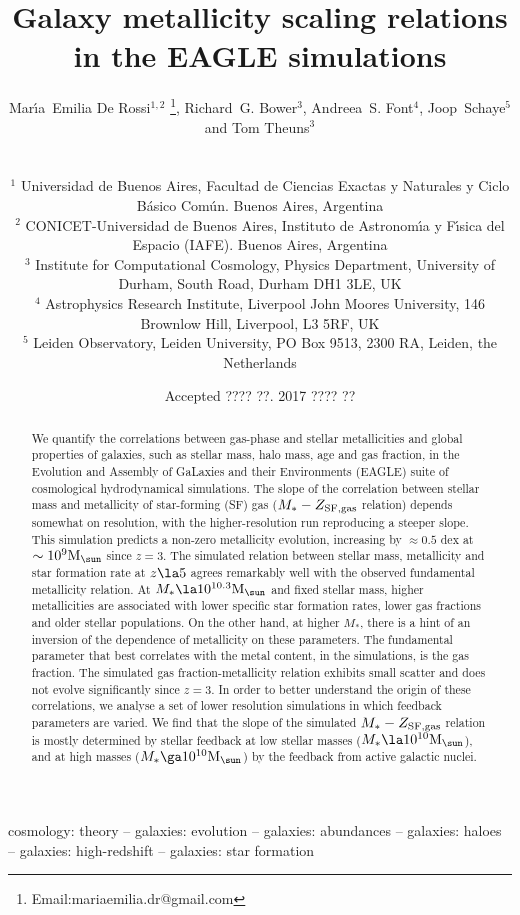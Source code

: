 \documentclass[useAMS,usenatbib]{mn2e}
\title[Metallicity scaling relations]
      {Galaxy metallicity scaling relations in the {\sc EAGLE} simulations}
\author[De Rossi et al.]
       {\parbox{17cm}{Mar\'{\i}a~Emilia De Rossi$^{1,2}$ \thanks{Email:mariaemilia.dr@gmail.com}, Richard~G. Bower$^{3}$, 
        Andreea~S. Font$^{4}$, Joop~Schaye$^{5}$ and Tom Theuns$^{3}$}
       \\     
       \\
       $^{1}$ Universidad de Buenos Aires, Facultad de Ciencias Exactas y Naturales y Ciclo B\'asico Com\'un. Buenos Aires, Argentina\\  
       $^{2}$ CONICET-Universidad de Buenos Aires, Instituto de Astronom\'{\i}a y F\'{\i}sica del Espacio (IAFE). Buenos Aires, Argentina\\ 
       $^{3}$ Institute for Computational Cosmology, Physics Department, University of Durham, South Road, Durham DH1 3LE, UK \\
       $^{4}$ Astrophysics Research Institute, Liverpool John Moores University, 146 Brownlow Hill, Liverpool, L3 5RF, UK\\
       $^{5}$ Leiden Observatory, Leiden University, PO Box 9513, 2300 RA, Leiden, the Netherlands
}
\begin{document}
\date{Accepted  ???? ??. 2017 ???? ??}

\pagerange{\pageref{firstpage}--\pageref{lastpage}} 

\maketitle

\label{firstpage}

\begin{abstract}
We quantify the correlations between gas-phase and stellar metallicities and 
global properties of galaxies, such as stellar mass, halo mass, age and gas fraction,
in the Evolution and Assembly of GaLaxies and their Environments ({\sc EAGLE})
suite of cosmological hydrodynamical simulations.  
The slope of the correlation
between stellar mass and metallicity of star-forming (SF) gas ($M_*-Z_{\rm SF,gas}$ relation)
depends somewhat on resolution, with the higher-resolution run reproducing a steeper slope.
This simulation predicts a non-zero metallicity evolution,
increasing by $\approx 0.5$ dex at $\sim 10^9 {\rm M}_{\sun}$ since $z = 3$.
The simulated relation between stellar mass, metallicity and star formation rate 
at $z \la 5$ agrees remarkably well with the observed fundamental metallicity relation.
At $M_* \la 10^{10.3} {\rm M}_{\sun}$ and fixed stellar mass, 
higher metallicities are associated with lower specific star formation rates, lower gas fractions and older stellar populations. 
On the other hand, at higher $M_*$, there is a hint of an inversion of the dependence of metallicity on these parameters.
The fundamental parameter that best correlates with the metal content, in the simulations,
is the gas fraction.  The simulated gas fraction-metallicity relation exhibits small scatter and
does not evolve significantly since $z = 3$. 
In order to better understand the origin of these correlations, we analyse a set of lower resolution simulations
in which feedback parameters are varied. We find 
that the slope of the simulated $M_*-Z_{\rm SF,gas}$ relation is mostly determined by stellar feedback at 
low stellar masses ($M_* \la 10^{10} {\rm M}_{\sun}$), and at high masses ($M_* \ga 10^{10} {\rm M}_{\sun}$) by the 
feedback from active galactic nuclei.  
\end{abstract}
                                                                                                                 
\begin{keywords}                                                                                                     
cosmology: theory -- galaxies: evolution -- galaxies: abundances -- 
galaxies: haloes -- galaxies: high-redshift -- 
galaxies: star formation 
\end{keywords}   
\end{document}
